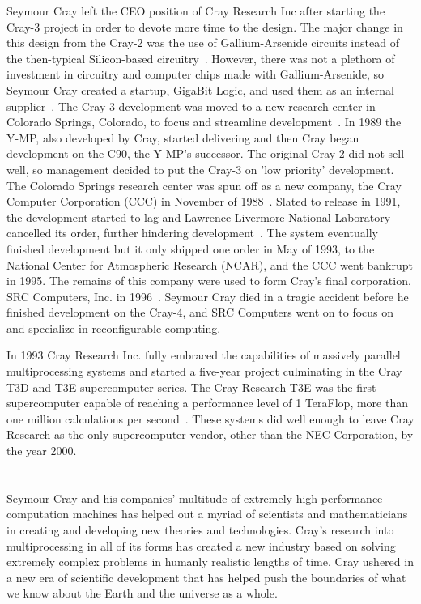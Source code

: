 \documentclass[12pt, letterpaper]{article}
\begin{document}
	Seymour Cray left the CEO position of Cray Research Inc after starting the Cray-3 project in order to devote more time to the design. The major change in this design from the Cray-2 was the use of Gallium-Arsenide circuits instead of the then-typical Silicon-based circuitry~\cite{readings}. However, there was not a plethora of investment in circuitry and computer chips made with Gallium-Arsenide, so Seymour Cray created a startup, GigaBit Logic, and used them as an internal supplier~\cite{gigabit}. The Cray-3 development was moved to a new research center in Colorado Springs, Colorado, to focus and streamline development~\cite{parallel}. In 1989 the Y-MP, also developed by Cray, started delivering and then Cray began development on the C90, the Y-MP's successor. The original Cray-2 did not sell well, so management decided to put the Cray-3 on 'low priority' development. The Colorado Springs research center was spun off as a new company, the Cray Computer Corporation (CCC) in November of 1988~\cite{parallel}. Slated to release in 1991, the development started to lag and Lawrence Livermore National Laboratory cancelled its order, further hindering development~\cite{orders}. The system eventually finished development but it only shipped one order in May of 1993, to the National Center for Atmospheric Research (NCAR), and the CCC went bankrupt in 1995. The remains of this company were used to form Cray's final corporation, SRC Computers, Inc. in 1996~\cite{bloomberg}. Seymour Cray died in a tragic accident before he finished development on the Cray-4, and SRC Computers went on to focus on and specialize in reconfigurable computing. 
	
	In 1993 Cray Research Inc. fully embraced the capabilities of massively parallel multiprocessing systems and started a five-year project culminating in the Cray T3D and T3E supercomputer series. The Cray Research T3E was the first supercomputer capable of reaching a performance level of 1 TeraFlop, more than one million calculations per second~\cite{teraflop}. These systems did well enough to leave Cray Research as the only supercomputer vendor, other than the NEC Corporation, by the year 2000. 
	
	
\section{}
	Seymour Cray and his companies' multitude of extremely high-performance computation machines has helped out a myriad of scientists and mathematicians in creating and developing new theories and technologies. Cray's research into multiprocessing in all of its forms has created a new industry based on solving extremely complex problems in humanly realistic lengths of time. Cray ushered in a new era of scientific development that has helped push the boundaries of what we know about the Earth and the universe as a whole.




\newpage
\nocite{*}


\end{document}
